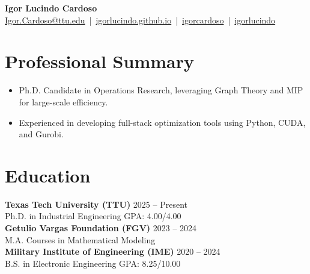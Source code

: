 \documentclass[letterpaper,10pt]{article}
\newcommand{\socialicon}[1]{\raisebox{-0.05em}{\resizebox{!}{1em}{#1}}}
\newcommand{\dategray}[1]{\textcolor{textgray}{#1}}
\begin{document}
\begin{center}
    {\Huge\textbf{Igor Lucindo Cardoso}}\\[4pt]
    \small{
    \href{mailto:Igor.Cardoso@ttu.edu}{Igor.Cardoso@ttu.edu} \,|\, 
    \socialicon{\faGlobe} \href{https://igorlucindo.github.io}{igorlucindo.github.io} \,|\, 
    \socialicon{\faLinkedin} \href{https://www.linkedin.com/in/igorlucindo/}{igorcardoso} \,|\, 
    \socialicon{\faGithub} \href{https://github.com/igorlucindo}{igorlucindo}
    }
\end{center}
\vspace{-4pt}

\section{Professional Summary}
\begin{itemize}[leftmargin=14pt, nosep, topsep=2pt, itemsep=1pt]
    \item Ph.D. Candidate in Operations Research, leveraging Graph Theory and MIP for large-scale efficiency.
    \item Experienced in developing full-stack optimization tools using Python, CUDA, and Gurobi.
\end{itemize}

\section{Education}
\textbf{Texas Tech University (TTU)} \hfill \dategray{2025 – Present} \\
Ph.D. in Industrial Engineering \hfill \dategray{GPA: 4.00/4.00} \\[2pt]
\textbf{Getulio Vargas Foundation (FGV)} \hfill \dategray{2023 – 2024} \\
M.A. Courses in Mathematical Modeling \\[2pt]
\textbf{Military Institute of Engineering (IME)} \hfill \dategray{2020 – 2024} \\
B.S. in Electronic Engineering \hfill \dategray{GPA: 8.25/10.00}

\end{document}

